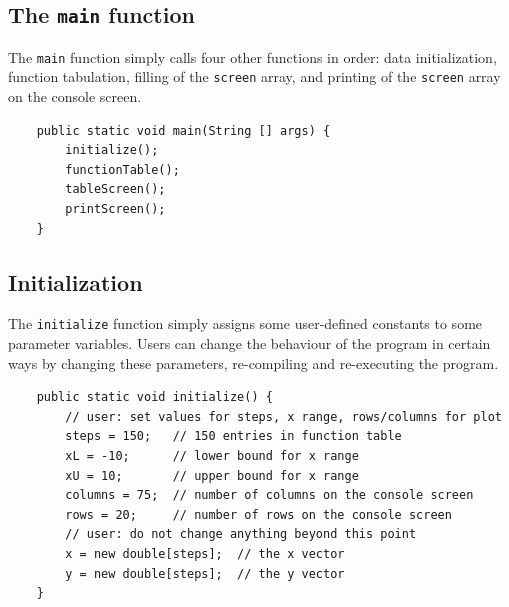 \documentclass[a4paper]{book}
\theoremstyle{changebreak}                %
\begin{document}
\subsection{The {\tt main} function}
The {\tt main} function simply calls four other functions in order:
data initialization, function tabulation, filling of the {\tt screen}
array, and printing of the {\tt screen} array on the
console screen.
\begin{verbatim}
    public static void main(String [] args) {
        initialize();
        functionTable();
        tableScreen();
        printScreen();
    }
\end{verbatim}

\subsection{Initialization}
The {\tt initialize} function simply assigns some
user-defined constants to some parameter variables. Users
can change the behaviour of the program in certain ways by changing
these parameters, re-compiling and re-executing the program.
\begin{verbatim}
    public static void initialize() {
        // user: set values for steps, x range, rows/columns for plot
        steps = 150;   // 150 entries in function table
        xL = -10;      // lower bound for x range
        xU = 10;       // upper bound for x range
        columns = 75;  // number of columns on the console screen
        rows = 20;     // number of rows on the console screen
        // user: do not change anything beyond this point
        x = new double[steps];  // the x vector
        y = new double[steps];  // the y vector
    }
\end{verbatim}
\end{document}

